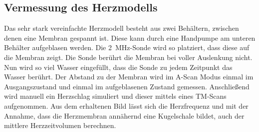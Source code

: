 \subsection{Vermessung des Herzmodells}
Das sehr stark vereinfachte Herzmodell besteht aus zwei Behältern, zwischen denen eine Membran gespannt ist.
Diese kann durch eine Handpumpe am unteren Behälter aufgeblasen werden.
Die \SI{2}{\mega\hertz}-Sonde wird so platziert, dass diese auf die Membran zeigt.
Die Sonde berührt die Membran bei voller Auslenkung nicht.
Nun wird so viel Wasser eingefüllt, dass die Sonde zu jedem Zeitpunkt das Wasser berührt.
Der Abstand zu der Membran wird im A-Scan Modus einmal im Ausgangszustand und einmal im aufgeblasenen Zustand gemessen.
Anschließend wird manuell ein Herzschlag simuliert und dieser mittels eines TM-Scans aufgenommen.
Aus dem erhaltenen Bild lässt sich die Herzfrequenz und mit der Annahme, dass die Herzmembran annähernd eine Kugelschale bildet,
auch der mittlere Herzzeitvolumen berechnen.
